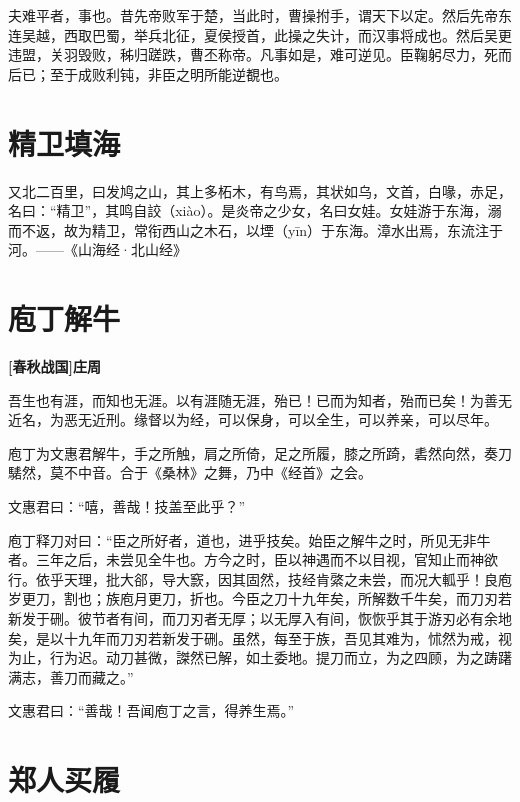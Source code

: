 \documentclass[UTF8,titlepage,oneside]{ctexbook}
\begin{document}
夫难平者，事也。昔先帝败军于楚，当此时，曹操拊手，谓天下以定。然后先帝东连吴越，西取巴蜀，举兵北征，夏侯授首，此操之失计，而汉事将成也。然后吴更违盟，关羽毁败，秭归蹉跌，曹丕称帝。凡事如是，难可逆见。臣鞠躬尽力，死而后已；至于成败利钝，非臣之明所能逆覩也。



\chapter*{精卫填海}

又北二百里，曰发鸠之山，其上多柘木，有鸟焉，其状如乌，文首，白喙，赤足，名曰：“精卫”，其鸣自詨（xiào）。是炎帝之少女，名曰女娃。女娃游于东海，溺而不返，故为精卫，常衔西山之木石，以堙（yīn）于东海。漳水出焉，东流注于河。——《山海经·北山经》



\chapter*{庖丁解牛}
\begin{center}
	\textbf{[春秋战国]庄周}
\end{center}

吾生也有涯，而知也无涯。以有涯随无涯，殆已！已而为知者，殆而已矣！为善无近名，为恶无近刑。缘督以为经，可以保身，可以全生，可以养亲，可以尽年。

庖丁为文惠君解牛，手之所触，肩之所倚，足之所履，膝之所踦，砉然向然，奏刀騞然，莫不中音。合于《桑林》之舞，乃中《经首》之会。

文惠君曰：“嘻，善哉！技盖至此乎？”

庖丁释刀对曰：“臣之所好者，道也，进乎技矣。始臣之解牛之时，所见无非牛者。三年之后，未尝见全牛也。方今之时，臣以神遇而不以目视，官知止而神欲行。依乎天理，批大郤，导大窾，因其固然，技经肯綮之未尝，而况大軱乎！良庖岁更刀，割也；族庖月更刀，折也。今臣之刀十九年矣，所解数千牛矣，而刀刃若新发于硎。彼节者有间，而刀刃者无厚；以无厚入有间，恢恢乎其于游刃必有余地矣，是以十九年而刀刃若新发于硎。虽然，每至于族，吾见其难为，怵然为戒，视为止，行为迟。动刀甚微，謋然已解，如土委地。提刀而立，为之四顾，为之踌躇满志，善刀而藏之。”

文惠君曰：“善哉！吾闻庖丁之言，得养生焉。”


\chapter*{郑人买履}
\end{document}
